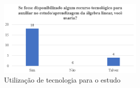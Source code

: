 \begin{figure}[htb]	
\center%
\includegraphics[width=7cm]{./img/tecnologia_usa.png}

\caption{Utilização de tecnologia para o estudo}

\end{figure}